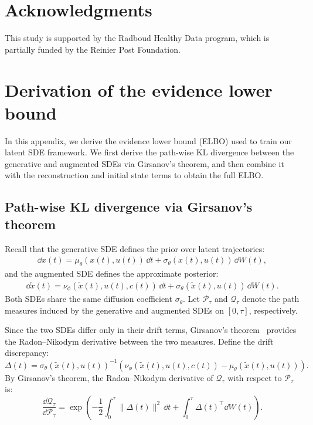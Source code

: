 \documentclass[preprint,12pt]{elsarticle}
\begin{document}
\section*{Acknowledgments}
This study is supported by the Radboud Healthy Data program, which is partially funded by the Reinier Post Foundation.

\appendix
\label{appndx}
\section{Derivation of the evidence lower bound}
\label{appndx:kl_derivation}

In this appendix, we derive the evidence lower bound (ELBO) used to train our latent SDE framework. We first derive the path-wise KL divergence between the generative and augmented SDEs via Girsanov's theorem, and then combine it with the reconstruction and initial state terms to obtain the full ELBO.

\subsection*{Path-wise KL divergence via Girsanov's theorem}

Recall that the generative SDE defines the prior over latent trajectories:
\begin{align}
    \dd x(t) = \mu_\theta(x(t), u(t))\,\dd t + \sigma_\theta(x(t), u(t))\,\dd W(t),
\end{align}
and the augmented SDE defines the approximate posterior:
\begin{align}
    \dd \tilde{x}(t) = \nu_\phi(\tilde{x}(t), u(t), c(t))\,\dd t + \sigma_\theta(\tilde{x}(t), u(t))\,\dd W(t).
\end{align}
Both SDEs share the same diffusion coefficient $\sigma_\theta$. Let $\mathcal{P}_\tau$ and $\mathcal{Q}_\tau$ denote the path measures induced by the generative and augmented SDEs on $[0, \tau]$, respectively.

Since the two SDEs differ only in their drift terms, Girsanov's theorem~\citep{girsanov1960transforming} provides the Radon--Nikodym derivative between the two measures. Define the drift discrepancy:
\begin{equation}
    \Delta(t) = \sigma_\theta(\tilde{x}(t), u(t))^{-1} \left( \nu_\phi(\tilde{x}(t), u(t), c(t)) - \mu_\theta(\tilde{x}(t), u(t)) \right).
\end{equation}
By Girsanov's theorem, the Radon--Nikodym derivative of $\mathcal{Q}_\tau$ with respect to $\mathcal{P}_\tau$ is:
\begin{equation}
    \frac{\dd \mathcal{Q}_\tau}{\dd \mathcal{P}_\tau} = \exp\left( -\frac{1}{2} \int_0^\tau \|\Delta(t)\|^2\,\dd t + \int_0^\tau \Delta(t)^\top \dd W(t) \right).
    \label{eq:radon_nikodym}
\end{equation}
\end{document}
